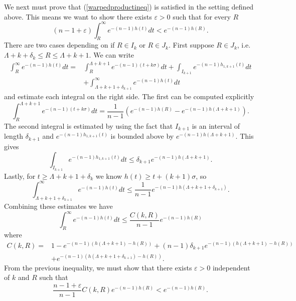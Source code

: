 \documentclass{amsart}
\theoremstyle{definition}
\theoremstyle{remark}
\numberwithin{equation}{section}
\begin{document}
We next must prove that (\ref{warpedproductineq}) is satisfied in the setting defined above. This means we want to show there exists $\varepsilon>0$ such that for every $R$
\begin{equation*}
(n-1+\varepsilon)\int_R^\infty e^{-(n-1)h(t)}dt<e^{-(n-1)h(R)}.
\end{equation*}
There are two cases depending on if $R\in I_k$ or $R\in J_k$. First suppose $R\in J_k$, i.e. $\Lambda +k+\delta_k\leq R\leq \Lambda +k+1$. We can write
\begin{align*}
\int_R^\infty e^{-(n-1)h(t)}dt=&\int_R^{\Lambda+k+1}e^{-(n-1)(t+k\sigma)}dt+\int_{I_{k+1}}e^{-(n-1)h_{1,k+1}(t)}dt\\
&+\int_{\Lambda+k+1+\delta_{k+1}}^\infty e^{-(n-1)h(t)}dt
\end{align*}
and estimate each integral on the right side. The first can be computed explicitly
\begin{equation*}
\int_R^{\Lambda+k+1}e^{-(n-1)(t+k\sigma)}dt=\frac{1}{n-1}\left(e^{-(n-1)h(R)}-e^{-(n-1)h(\Lambda+k+1)}\right).
\end{equation*}
The second integral is estimated by using the fact that $I_{k+1}$ is an interval of length $\delta_{k+1}$ and $e^{-(n-1)h_{1,k+1}(t)}$ is bounded above by $e^{-(n-1)h(\Lambda+k+1)}$. This gives
\begin{equation*}
\int_{I_{k+1}}e^{-(n-1)h_{1,k+1}(t)}dt\leq \delta_{k+1}e^{-(n-1)h(\Lambda+k+1)}.
\end{equation*}
Lastly, for $t\geq \Lambda+k+1+\delta_k$ we know $h(t)\geq t+(k+1)\sigma$, so
\begin{equation*}
\int_{\Lambda+k+1+\delta_{k+1}}^\infty e^{-(n-1)h(t)}dt\leq \frac{1}{n-1}e^{-(n-1)h(\Lambda+k+1+\delta_{k+1})}.
\end{equation*}
Combining these estimates we have
\begin{equation*}
\int_R^\infty e^{-(n-1)h(t)}dt\leq \frac{C(k, R)}{n-1}e^{-(n-1)h(R)}
\end{equation*}
where
\begin{align*}
C(k,R)=&1-e^{-(n-1)(h(\Lambda+k+1)-h(R))}+(n-1)\delta_{k+1}e^{-(n-1)(h(\Lambda+k+1)-h(R))}\\
&+e^{-(n-1)(h(\Lambda+k+1+\delta_{k+1})-h(R))}.
\end{align*}
From the previous inequality, we must show that there exists $\varepsilon>0$ independent of $k$ and $R$ such that 
\begin{equation*}
\frac{n-1+\varepsilon}{n-1}C(k,R)e^{-(n-1)h(R)}<e^{-(n-1)h(R)}.
\end{equation*}
\end{document}
